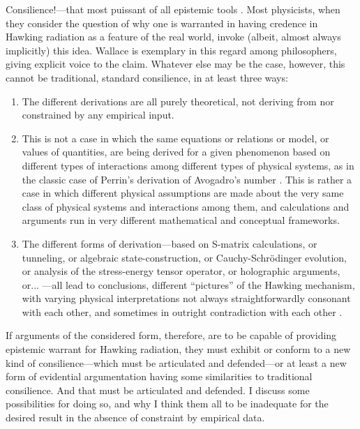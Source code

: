 \documentclass[11pt]{article}
\begin{document}
Consilience!—that most puissant of all epistemic tools \cite{Whewell1858}. Most physicists, when they consider the question of why one is warranted in having credence in Hawking radiation as a feature of the real world, invoke (albeit, almost always implicitly) this idea. Wallace \cite{Wallace2018, Wallace2019} is exemplary in this regard among philosophers, giving explicit voice to the claim. Whatever else may be the case, however, this cannot be traditional, standard consilience, in at least three ways:

\begin{enumerate}
    \item The different derivations are all purely theoretical, not deriving from nor constrained by any empirical input.
    \item This is not a case in which the same equations or relations or model, or values of quantities, are being derived for a given phenomenon based on different types of interactions among different types of physical systems, as in the classic case of Perrin’s derivation of Avogadro’s number \cite{Perrin1910, Smith2020}. This is rather a case in which different physical assumptions are made about the very same class of physical systems and interactions among them, and calculations and arguments run in very different mathematical and conceptual frameworks.
    \item The different forms of derivation—based on S-matrix calculations, or tunneling, or algebraic state-construction, or Cauchy-Schrödinger evolution, or analysis of the stress-energy tensor operator, or holographic arguments, or... —all lead to conclusions, different “pictures” of the Hawking mechanism, with varying physical interpretations not always straightforwardly consonant with each other, and sometimes in outright contradiction with each other \cite{Curiel2024}.
\end{enumerate}

If arguments of the considered form, therefore, are to be capable of providing epistemic warrant for Hawking radiation, they must exhibit or conform to a new kind of consilience—which must be articulated and defended—or at least a new form of evidential argumentation having some similarities to traditional consilience. And that must be articulated and defended. I discuss some possibilities for doing so, and why I think them all to be inadequate for the desired result in the absence of constraint by empirical data.

\ 
\end{document}
